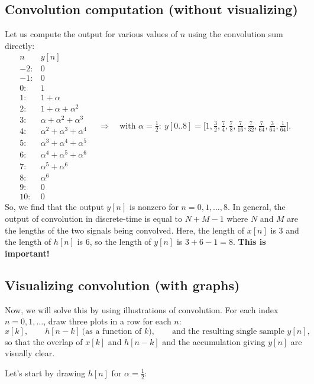 \documentclass{ee102_notes}
\begin{document}
\subsection{Convolution computation (without visualizing)}

Let us compute the output for various values of $n$ using the convolution sum directly:
\[
\begin{array}{c|l}
n & y[n] \\ \hline
-2: & 0\\
-1: & 0\\
0: & 1\\
1: & 1+\alpha\\
2: & 1+\alpha+\alpha^2\\
3: & \alpha+\alpha^2+\alpha^3\\
4: & \alpha^2+\alpha^3+\alpha^4\\
5: & \alpha^3+\alpha^4+\alpha^5\\
6: & \alpha^4+\alpha^5+\alpha^6\\
7: & \alpha^5+\alpha^6\\
8: & \alpha^6\\
9: & 0\\
10: & 0
\end{array}
\quad\Rightarrow\quad
\text{with }\alpha=\tfrac12:\ 
y[0..8]=\Big[1,\tfrac32,\tfrac74,\tfrac78,\tfrac7{16},\tfrac7{32},\tfrac7{64},\tfrac3{64},\tfrac1{64}\Big].
\]
So, we find that the output $y[n]$ is nonzero for $n=0,1,\ldots,8$. In general, the output of convolution in discrete-time is equal to $N+M-1$ where $N$ and $M$ are the lengths of the two signals being convolved. Here, the length of $x[n]$ is $3$ and the length of $h[n]$ is $6$, so the length of $y[n]$ is $3+6-1=8$. \textbf{This is important!}
\subsection{Visualizing convolution (with graphs)}
Now, we will solve this by using illustrations of convolution. For each index $n=0,1,\dots $, draw three plots in a row for each $n$:
\[
x[k],\qquad h[n-k]\ \text{(as a function of $k$)},\qquad \text{and the resulting single sample }y[n],
\]
so that the overlap of $x[k]$ and $h[n-k]$ and the accumulation giving $y[n]$ are visually clear.

Let's start by drawing $h[n]$ for $\alpha = \tfrac{1}{2}$:

\def\Alpha{0.5}
\def\HLen{6}     %
\def\kmin{-2}    %
\def\kmax{10}
\end{document}
